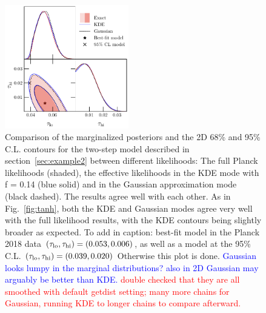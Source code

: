 \documentclass[prd,twocolumn,amsmath,amssymb,floatfix,superscriptaddress,nofootinbib]{revtex4-1}
\newcommand{\refsec}[1]{section~\ref{sec:#1}}
\newcommand{\tauhi}{\tau_{\rm hi}}
\newcommand{\taulo}{\tau_{\rm lo}}
\newcommand{\wh}[1]{\textcolor{blue}{#1}}
\newcommand{\ch}[1]{\textcolor{red}{#1}}
\begin{document}
%
%

\begin{figure}[t]
\includegraphics[width=0.48\textwidth]{paper/plots/pl18_tanh_highz_test5_run1_vs_relike_tanh_highz_test8_run9_f0p14_taulo_prior_0p03_zre_prior_6p1_taulo_prior_0p0_tri.pdf}
\caption{Comparison of the marginalized posteriors and the 2D 68\% and 95\% C.L. contours for the two-step model  described in \refsec{example2} between different likelihoods: The full Planck likelihoods (shaded), the effective likelihoods in the KDE mode with f = 0.14 (blue solid) and in the Gaussian approximation mode (black dashed). The results agree well with each other. As in Fig.~\ref{fig:tanh}, both the KDE and Gaussian modes agree very well with the full likelihood results, with the KDE  contours being slightly broader as expected. {To add in caption: best-fit model in the Planck 2018 data $(\taulo, \tauhi) = (0.053, 0.006)$, as well as  a model at the 95\% C.L. $(\taulo, \tauhi) = (0.039, 0.020)$}  {Otherwise this plot is done.} \wh{Gaussian looks lumpy in the marginal distributions?  also in 2D Gaussian may arguably be better than KDE. \ch{double checked that they are all smoothed with default getdist setting; many more chains for Gaussian, running KDE to longer chains to compare afterward.}}
}
\label{fig:two_parameter_model_2D}
\end{figure}
\end{document}
